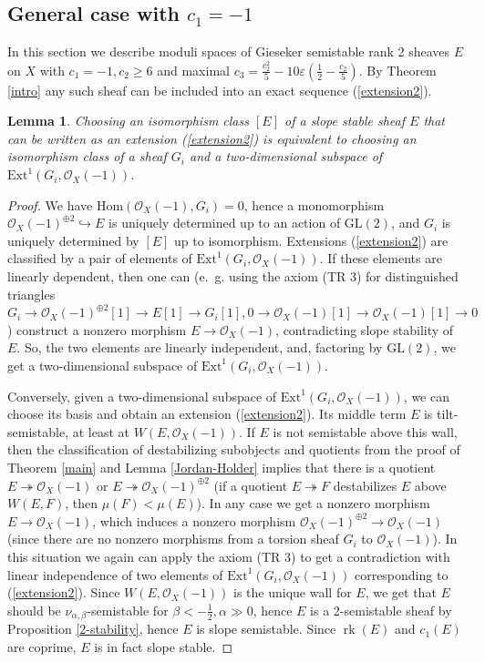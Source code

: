 \documentclass{amsart}
\DeclareMathOperator{\rk}{{rk}}
\newtheorem{lemma}[theorem]{Lemma}
\begin{document}
\subsection{General case with $c_1=-1$}\label{section -1} In this section we describe moduli spaces of Gieseker semistable rank 2 sheaves $E$ on $X$ with $c_1=-1,c_2\ge 6$ and maximal $c_3=\frac{c_2^2}{5}-10\varepsilon(\frac 12-\frac{c_2}{5})$. By Theorem \ref{intro} any such sheaf can be included into an exact sequence (\ref{extension2}).

\begin{lemma}\label{Gr}Choosing an isomorphism class $[E]$ of a slope stable sheaf $E$ that can be written as an extension (\ref{extension2}) is equivalent to choosing an isomorphism class of a sheaf $G_i$ and a two-dimensional subspace of $\mathrm{Ext}^1(G_i,\mathcal O_X(-1))$.
\end{lemma}

\begin{proof}We have $\mathrm{Hom}(\mathcal O_X(-1),G_i)=0$, hence a monomorphism $\mathcal O_X(-1)^{\oplus 2}\hookrightarrow E$ is uniquely determined up to an action of $\mathrm{GL}(2)$, and $G_i$ is uniquely determined by $[E]$ up to isomorphism. Extensions (\ref{extension2}) are classified by a pair of elements of $\mathrm{Ext}^1(G_i,\mathcal O_X(-1))$. If these elements are linearly dependent, then one can (e.~g. using the axiom (TR 3) for distinguished triangles $G_i\to\mathcal O_X(-1)^{\oplus 2}[1]\to E[1]\to G_i[1],0\to\mathcal O_X(-1)[1]\to\mathcal O_X(-1)[1]\to 0$) construct a nonzero morphism $E\to\mathcal O_X(-1)$, contradicting slope stability of $E$. So, the two elements are linearly independent, and, factoring by $\mathrm{GL}(2)$, we get a two-dimensional subspace of $\mathrm{Ext}^1(G_i,\mathcal O_X(-1))$.
	
Conversely, given a two-dimensional subspace of $\mathrm{Ext}^1(G_i,\mathcal O_X(-1))$, we can choose its basis and obtain an extension (\ref{extension2}). Its middle term $E$ is tilt-semistable, at least at $W(E,\mathcal O_X(-1))$. If $E$ is not semistable above this wall, then the classification of destabilizing subobjects and quotients from the proof of Theorem \ref{main} and Lemma \ref{Jordan-Holder} implies that there is a quotient $E\twoheadrightarrow\mathcal O_X(-1)$ or $E\twoheadrightarrow\mathcal O_X(-1)^{\oplus 2}$ (if a quotient $E\twoheadrightarrow F$ destabilizes $E$ above $W(E,F)$, then $\mu(F)<\mu(E)$). In any case we get a nonzero morphism $E\to\mathcal O_X(-1)$, which induces a nonzero morphism $\mathcal O_X(-1)^{\oplus 2}\to\mathcal O_X(-1)$ (since there are no nonzero morphisms from a torsion sheaf $G_i$ to $\mathcal O_X(-1)$). In this situation we again can apply the axiom (TR 3) to get a contradiction with linear independence of two elements of $\mathrm{Ext}^1(G_i,\mathcal O_X(-1))$ corresponding to (\ref{extension2}). Since $W(E,\mathcal O_X(-1))$ is the unique wall for $E$, we get that $E$ should be $\nu_{\alpha,\beta}$-semistable for $\beta<-\frac 12,\alpha\gg 0$, hence $E$ is a 2-semistable sheaf by Proposition \ref{2-stability}, hence $E$ is slope semistable. Since $\rk(E)$ and $c_1(E)$ are coprime, $E$ is in fact slope stable.
\end{proof}
\end{document}
